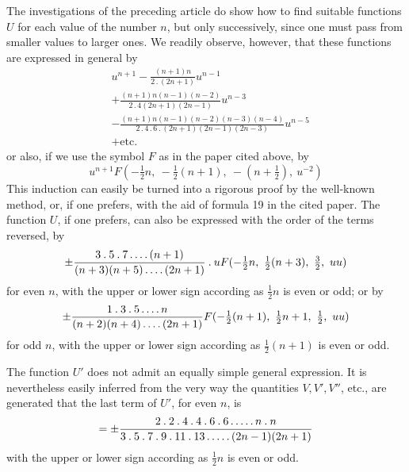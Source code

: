 The investigations of the preceding article do show how to find suitable functions $U$ for each value of the number $n$, but only successively, since one must pass from smaller values to larger ones. We readily observe, however, that these functions are expressed in general by
\[
\begin{aligned}&
u^{n+1}-\frac{(n+1)n}{2\mathbin{.}(2n+1)}u^{n-1}
\\[5pt]&+\frac{(n+1)n(n-1)(n-2)}{2\mathbin{.}4(2n+1)(2n-1)}u^{n-3}
\\[5pt]&-\frac{(n+1)n(n-1)(n-2)(n-3)(n-4)}{2\mathbin{.}4\mathbin{.}6\mathbin{.}(2n+1)(2n-1)(2n-3)}u^{n-5}\\ &
+\text{etc.}
\end{aligned}
\]
or also, if we use the symbol $F$ as in the paper cited above, by
\[
u^{n+1}F(-\tfrac12n,\ -\tfrac12(n+1),\ -(n+\tfrac12),\ u^{-2})
\]
This induction can easily be turned into a rigorous proof by the well-known method, or, if one prefers, with the aid of formula 19 in the cited paper. The function $U$, if one prefers, can also be expressed with the order of the terms reversed, by
\[
\pm\frac{3\mathbin{.}5\mathbin{.}7\mathinner{.\,.\,.\,.}(n+1)}{(n+3)(n+5)\mathinner{.\,.\,.\,.}(2n+1)}\mathbin{.}uF(-\tfrac12n,\ \tfrac12(n+3),\ \tfrac32,\ uu)
\]
for even $n$, with the upper or lower sign according as $\frac12n$ is even or odd; or by
\[
\pm\frac{1\mathbin{.}3\mathbin{.}5\mathinner{.\,.\,.\,.} n}{(n+2)(n+4)\mathinner{.\,.\,.\,.}(2n+1)}F(-\tfrac12(n+1),\ \tfrac12n+1,\ \tfrac12,\ uu)
\]
for odd $n$, with the upper or lower sign according as $\frac12(n+1)$ is even or odd.

The function $U'$ does not admit an equally simple general expression. It is nevertheless easily inferred from the very way the quantities $V,V',V''$, etc., are generated that the last term of $U'$, for even $n$, is
\[
=\pm\frac{2\mathbin{.}2\mathbin{.}4\mathbin{.}4\mathbin{.}6\mathbin{.}6\mathinner{.\,.\,.\,.\,.} n\mathbin{.}n}{3\mathbin{.}5\mathbin{.}7\mathbin{.}9\mathbin{.}11\mathbin{.}13\mathinner{.\,.\,.\,.\,.}(2n-1)(2n+1)}
\]
with the upper or lower sign according as $\frac12n$ is even or odd.

